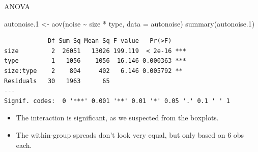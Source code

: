 \documentclass[
  ignorenonframetext,
]{beamer}
\newenvironment{Shaded}{\begin{snugshade}}{\end{snugshade}}
\newcommand{\AttributeTok}[1]{\textcolor[rgb]{0.40,0.45,0.13}{#1}}
\newcommand{\FloatTok}[1]{\textcolor[rgb]{0.68,0.00,0.00}{#1}}
\newcommand{\FunctionTok}[1]{\textcolor[rgb]{0.28,0.35,0.67}{#1}}
\newcommand{\NormalTok}[1]{\textcolor[rgb]{0.00,0.23,0.31}{#1}}
\newcommand{\OtherTok}[1]{\textcolor[rgb]{0.00,0.23,0.31}{#1}}
\newcommand{\SpecialCharTok}[1]{\textcolor[rgb]{0.37,0.37,0.37}{#1}}
\begin{document}
\begin{frame}[fragile]{ANOVA}
\protect\hypertarget{anova}{}
\small

\begin{Shaded}
\begin{Highlighting}[]
\NormalTok{autonoise}\FloatTok{.1} \OtherTok{\textless{}{-}} \FunctionTok{aov}\NormalTok{(noise }\SpecialCharTok{\textasciitilde{}}\NormalTok{ size }\SpecialCharTok{*}\NormalTok{ type, }\AttributeTok{data =}\NormalTok{ autonoise)}
\FunctionTok{summary}\NormalTok{(autonoise}\FloatTok{.1}\NormalTok{)}
\end{Highlighting}
\end{Shaded}

\begin{verbatim}
            Df Sum Sq Mean Sq F value   Pr(>F)    
size         2  26051   13026 199.119  < 2e-16 ***
type         1   1056    1056  16.146 0.000363 ***
size:type    2    804     402   6.146 0.005792 ** 
Residuals   30   1963      65                     
---
Signif. codes:  0 '***' 0.001 '**' 0.01 '*' 0.05 '.' 0.1 ' ' 1
\end{verbatim}

\normalsize

\begin{itemize}
\item
  The interaction is significant, as we suspected from the boxplots.
\item
  The within-group spreads don't look very equal, but only based on 6
  obs each.
\end{itemize}
\end{frame}
\end{document}

